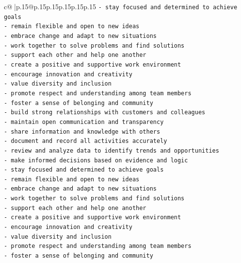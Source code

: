 \documentclass{article}
\begin{document}
{\begin{supertabular}{c@{$\;$}|p{.15\linewidth}@{}p{.15\linewidth}p{.15\linewidth}p{.15\linewidth}p{.15\linewidth}p{.15\linewidth}}
{{{\texttt{{-} stay focused and determined to achieve goals} \\
\texttt{{-} remain flexible and open to new ideas} \\
\texttt{{-} embrace change and adapt to new situations} \\
\texttt{{-} work together to solve problems and find solutions} \\
\texttt{{-} support each other and help one another} \\
\texttt{{-} create a positive and supportive work environment} \\
\texttt{{-} encourage innovation and creativity} \\
\texttt{{-} value diversity and inclusion} \\
\texttt{{-} promote respect and understanding among team members} \\
\texttt{{-} foster a sense of belonging and community} \\
\texttt{{-} build strong relationships with customers and colleagues} \\
\texttt{{-} maintain open communication and transparency} \\
\texttt{{-} share information and knowledge with others} \\
\texttt{{-} document and record all activities accurately} \\
\texttt{{-} review and analyze data to identify trends and opportunities} \\
\texttt{{-} make informed decisions based on evidence and logic} \\
\texttt{{-} stay focused and determined to achieve goals} \\
\texttt{{-} remain flexible and open to new ideas} \\
\texttt{{-} embrace change and adapt to new situations} \\
\texttt{{-} work together to solve problems and find solutions} \\
\texttt{{-} support each other and help one another} \\
\texttt{{-} create a positive and supportive work environment} \\
\texttt{{-} encourage innovation and creativity} \\
\texttt{{-} value diversity and inclusion} \\
\texttt{{-} promote respect and understanding among team members} \\
\texttt{{-} foster a sense of belonging and community} \\
}}}
\end{supertabular}}
\end{document}
